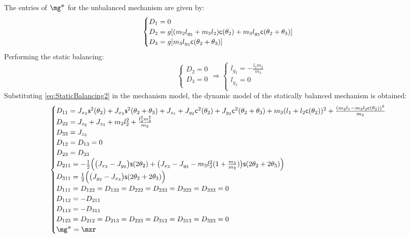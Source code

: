 \documentclass[a4paper,11pt,brazil,fleqn]{article}
\begin{document}
The entries of $\mg\ssh$ for the unbalanced mechanism are given by:
\begin{equation}
\begin{cases}\label{eq:gh2}
D_1 = 0 \\
D_2 = g[ (m_2 l_{g_2} + m_3 l_2  ) \mathsf{c}(\theta_2) + m_3 l_{g_3} \mathsf{c}(\theta_2 + \theta_3) ]  \\
D_3 = g[ m_3 l_{g_3} \mathsf{c}(\theta_2 + \theta_3)  ] \\
\end{cases}
\end{equation} 
Performing the static balancing:
\begin{equation}\label{eq:StaticBalancing2}
\begin{cases}
D_2 = 0 \\
D_3 = 0 \\
\end{cases}
\Rightarrow
\begin{cases}
l_{g_2} = -\frac{l_2 m_3}{m_2} \\
l_{g_3} = 0 \\
\end{cases}
\end{equation}
Substituting \eqref{eq:StaticBalancing2} in the mechanism model, the dynamic model of the statically balanced mechanism is obtained:
\begin{equation}\label{eq:StaticBalanced2}
\begin{cases}
D_{11} = J_{x_2}\ssin^2(\theta_2) + J_{x_3}\ssin^2(\theta_2+\theta_3) + J_{z_1} + J_{y_2}\ccos^2(\theta_2) + J_{y_3}\ccos^2(\theta_2+\theta_3) + m_3 (l_1 + l_2 \ccos(\theta_2))^2 + \frac{(m_2 l_1 - m_3 l_2 \ccos(\theta_2))^2}{m_2} \\
D_{22} = J_{z_2} + J_{z_3} + m_2 l_2^2 + \frac{l_2^2 m_3^2}{m_2} \\
D_{33} = J_{z_3} \\
D_{12} = D_{13} = 0 \\
D_{23} = D_{33} \\
D_{211} = -\frac{1}{2} \Big( \big( J_{x_2} - J_{y_2} \big) \ssin(2\theta_2) + \big(J_{x_3} - J_{y_3} - m_3 l_2^2 ( 1 + \frac{m_3}{m_2} )\big)\ssin(2\theta_2+2\theta_3)    \Big) \\
D_{311} = \frac{1}{2} \Big( \big(J_{y_3} - J_{x_3} \big)\ssin(2\theta_2+2\theta_3) \Big) \\
D_{111} = D_{122} = D_{133} = D_{222} = D_{233} = D_{322} = D_{333} = 0 \\
D_{112} = - D_{211} \\
D_{113} = - D_{311} \\
D_{123} = D_{212} = D_{213} = D_{223} = D_{312} = D_{313} = D_{323} = 0 \\
\mg\ssh = \mzr
\end{cases}
\end{equation}
\end{document}

